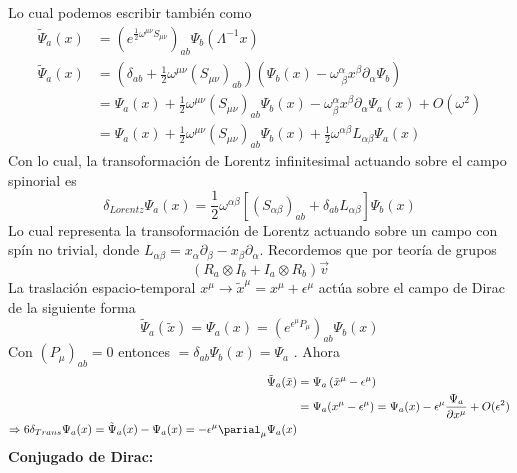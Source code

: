 \documentclass[../main.tex]{subfiles}
\begin{document}
Lo cual podemos escribir también como
\begin{align*}
  \tilde{\Psi}_a(x)  &= \left( e^{\frac{1}{2}\omega^{\mu \nu}S_{\mu \nu}} \right)_{ab} \Psi_b(\Lambda^{-1}x) \\
  \tilde{\Psi}_a(x) & = \left( \delta_{ab} + \frac{1}{2}\omega^{\mu \nu} \left( S_{\mu \nu} \right)_{ab} \right) \left( \Psi_b(x) - \omega^\alpha_{\; \beta} x^\beta \partial_\alpha  \Psi_b \right) \\
  & = \Psi_a(x) + \frac{1}{2} \omega^{\mu \nu} \left( S_{\mu \nu} \right)_{ab} \Psi_b(x) - \omega^\alpha_\beta x^\beta \partial_\alpha \Psi_a(x) + O(\omega^2) \\
  & = \Psi_a(x) + \frac{1}{2}\omega^{\mu \nu} \left( S_{\mu \nu} \right)_{ab} \Psi_b(x) + \frac{1}{2} \omega^{\alpha \beta} L_{\alpha \beta} \Psi_a(x)
\end{align*}
Con lo cual, la transoformación de Lorentz infinitesimal actuando sobre el campo spinorial es
\begin{equation}
  \delta_{Lorentz} \Psi_a(x) = \frac{1}{2}\omega^{\alpha \beta} \left[ \left( S_{\alpha\beta} \right)_{a b }  + \delta_{ab} L_{\alpha \beta} \right]\Psi_b(x)
 \end{equation}
 Lo cual representa la transoformación de Lorentz actuando sobre un campo con spín no trivial, donde $L_{\alpha \beta}  = x_\alpha \partial_\beta - x_\beta \partial_\alpha$. 
 Recordemos que por teoría de grupos
 \begin{equation}
   (R_a \otimes I_b + I_a \otimes R_b ) \vec{v}
  \end{equation}
  La traslación espacio-temporal $x^\mu \rightarrow \tilde{x}^\mu= x^\mu + \epsilon^\mu$ actúa sobre el campo de Dirac de la siguiente forma
  \begin{equation}
    \tilde{\Psi}_a(\tilde{x}) = \Psi_a(x) = \left( e^{\epsilon^\mu P_\mu} \right)_{ab} \Psi_b(x)
   \end{equation}
  Con $\left( P_\mu \right)_{ab} = 0$ entonces $=\delta_{ab}\Psi_b(x) = \Psi_a$ . Ahora
  \begin{align*}
    \tilde{\Psi}_a(\tilde{x})  &=\Psi_a\left(\tilde{x}^\mu - \epsilon^\mu \right) \\
    & = \Psi_a(x^\mu - \epsilon^\mu ) = \Psi_a(x) - \epsilon^\mu \frac{\Psi_a}{\partial x^\mu} + O(\epsilon^2) \\
    \Rightarrow 6 \delta_{Trans} \Psi_a(x) = \tilde{\Psi}_a(x) - \Psi_a(x) = -\epsilon^\mu \parial_\mu \Psi_a(x)
  \end{align*}
  \textbf{Conjugado de Dirac:}
\end{document}
